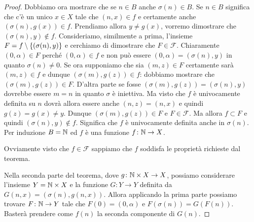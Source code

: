 \begin{proof}
Dobbiamo ora mostrare che se $n\in B$ anche $\sigma(n)\in B$.
Se $n\in B$ significa che c'è un unico $x\in X$ tale che $(n,x)\in f$
e certamente anche $(\sigma(n),g(x))\in f$.
Prendiamo allora $y\neq g(x)$, vorremo dimostrare che $(\sigma(n),y)\not \in f$.
Consideriamo, similmente a prima, l'insieme $F=f\setminus{\left\{ (\sigma(n),y) \right\}}$
e cerchiamo di dimostrare che $F\in \mathcal F$.
Chiaramente $(0,\alpha)\in F$ perché $(0,\alpha)\in f$ 
e non può essere $(0,\alpha)=(\sigma(n),y)$ in quanto $\sigma(n)\neq 0$.
Se ora supponiamo che sia $(m,z)\in F$ certamente sarà $(m,z)\in f$ 
e dunque $(\sigma(m),g(z))\in f$: 
dobbiamo mostrare che $(\sigma(m),g(z))\in F$. 
D'altra parte se fosse $(\sigma(m), g(z))=(\sigma(n),y)$ 
dovrebbe essere $m=n$ in quanto $\sigma$ è iniettiva. 
Ma visto che $f$ è univocamente definita su $n$ dovrà allora essere 
anche $(n,z) = (n,x)$ e quindi $g(z)=g(x) \neq y$. 
Dunque $(\sigma(m),g(z))\in F$ e $F\in \mathcal F$.
Ma allora $f\subset F$ e quindi $(\sigma(n),y)\not \in f$.
Significa che $f$ è univocamente definita anche in $\sigma(n)$.
Per induzione $B={\mathbb N}$ ed $f$ è una funzione $f\colon {\mathbb N}\to X$.

Ovviamente visto che $f\in \mathcal F$ sappiamo che $f$ 
soddisfa le proprietà richieste dal teorema.

Nella seconda parte del teorema, dove $g\colon {\mathbb N}\times X \to X$,
possiamo considerare l'insieme $Y={\mathbb N}\times X$ e la funzione 
$G\colon Y\to Y$ definita da $G(n,x) = (\sigma(n), g(n,x))$.
Allora applicando la prima parte possiamo trovare $F\colon {\mathbb N}\to Y$
tale che $F(0) = (0,\alpha)$ e $F(\sigma(n)) = G(F(n))$.
Basterà prendere come $f(n)$ la seconda componente di $G(n)$.
\end{proof}
  
